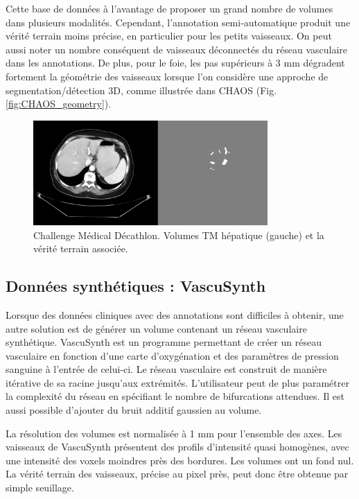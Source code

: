 Cette base de données à l'avantage de proposer un grand nombre de volumes dans plusieurs modalités. Cependant, l'annotation semi-automatique produit une vérité terrain moins précise, en particulier pour les petits vaisseaux. On peut aussi noter un nombre conséquent de vaisseaux déconnectés du réseau vasculaire dans les annotations. De plus, pour le foie, les pas supérieurs à 3 mm dégradent fortement la géométrie des vaisseaux lorsque l'on considère une approche de segmentation/détection 3D, comme illustrée dans CHAOS (Fig. \ref{fig:CHAOS_geometry}).

\begin{figure}
    \centering
    \includegraphics[height=4cm]{Images/MD_examples.png}
    \caption{Challenge Médical Décathlon. Volumes TM hépatique (gauche) et la vérité terrain associée.}
    \label{fig:MD_examples}
\end{figure}

\subsection{Données synthétiques : VascuSynth}

Lorsque des données cliniques avec des annotations sont difficiles à obtenir, une autre solution est de générer un volume contenant un réseau vasculaire synthétique. VascuSynth est un programme permettant de créer un réseau vasculaire en fonction d'une carte d'oxygénation et des paramètres de pression sanguine à l'entrée de celui-ci. Le réseau vasculaire est construit de manière itérative de sa racine jusqu'aux extrémités. L'utilisateur peut de plus paramétrer la complexité du réseau en spécifiant le nombre de bifurcations attendues. Il est aussi possible d'ajouter du bruit additif gaussien au volume.

La résolution des volumes est  normalisée à 1 mm pour l'ensemble des axes. Les vaisseaux de VascuSynth présentent des profils d'intensité quasi homogènes, avec une intensité des voxels moindres près des bordures. Les volumes ont un fond nul. La vérité terrain des vaisseaux, précise au pixel près, peut donc être obtenue par simple seuillage.

